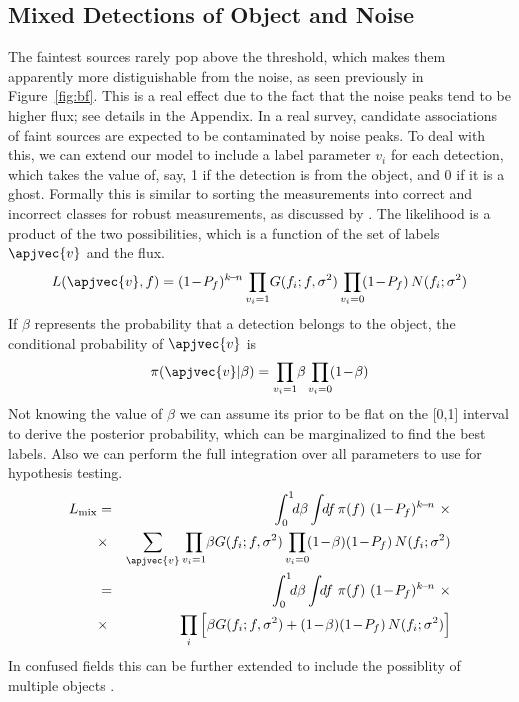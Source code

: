 \iffalse
\subsection{Mixed Detections of Object and Noise}
\label{sec:mix}
\noindent
The faintest sources rarely pop above the threshold, which makes them apparently more distiguishable from the noise, as seen previously in Figure~\ref{fig:bf}. This is a real effect due to the fact that the noise peaks tend to be higher flux; see details in the Appendix. In a real survey, candidate associations of faint sources are expected to be contaminated  by noise peaks. To deal with this, we can  extend our model to include a label parameter $v_i$ for each detection, which takes the value of, say, 1 if the detection is from the object, and 0 if it is a ghost.
%
Formally this is similar to sorting the measurements into correct and incorrect classes for robust measurements, as discussed by \citet{press}.
%
The likelihood is a product of the two possibilities, which is a function of the set of labels $\apjvec{v}$ and the flux.
%
\begin{equation}
L(\apjvec{v},f)= (1\!-\!P_f)^{k\!-\!n} \prod_{v_i=1}\!G(f_i;f,\sigma^2) \prod_{v_i=0}\!(1\!-\!P_f)\,N(f_i;\sigma^2)
\end{equation}
%
If $\beta$ represents the probability that a detection belongs to the object, the conditional probability of $\apjvec{v}$ is
%
\begin{equation}
\pi(\apjvec{v}|\beta) = \prod_{v_i=1}\!\beta \prod_{v_i=0}\!(1\!-\!\beta)
\end{equation}
%
Not knowing the value of $\beta$ we can assume its prior to be flat on the [0,1] interval to derive the posterior probability, which can be marginalized to find the best labels. Also we can perform the full integration over all parameters to use for hypothesis testing.
%
\begin{eqnarray}
L_{\text{mix}} & = & \int_0^1\!\!d\beta \int\!\!df\,\pi(f)\ (1\!-\!P_f)^{k\!-\!n} \ \times\\
 & \times & \sum_{\apjvec{v}}\prod_{v_i=1}\!\beta G(f_i;f,\sigma^2) \prod_{v_i=0}\!(1\!-\!\beta)(1\!-\!P_f)\,N(f_i;\sigma^2) \nonumber \\
 & = & \int_0^1\!\!d\beta \int\!\!df\ \pi(f)\ (1\!-\!P_f)^{k\!-\!n}  \ \times \\
 & \times & \prod_i \Big[\beta G(f_i;f,\sigma^2) + (1\!-\!\beta)(1\!-\!P_f)\,N(f_i;\sigma^2) \Big] \nonumber
\end{eqnarray}
%
In confused fields this can be further extended to include the possiblity of multiple objects \citep{loredo}.




